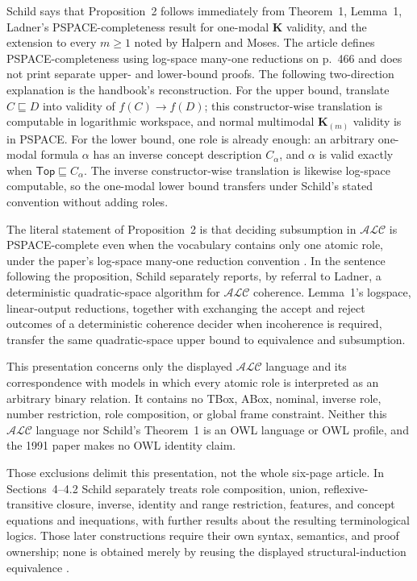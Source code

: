 Schild says that Proposition~2 follows immediately from Theorem~1, Lemma~1,
Ladner's PSPACE-completeness result for one-modal \(\mathbf K\) validity, and
the extension to every \(m\geq 1\) noted by Halpern and Moses.  The article
defines PSPACE-completeness using log-space many-one reductions on p.~466 and
does not print separate upper- and lower-bound proofs.  The following
two-direction explanation is the handbook's reconstruction.  For the upper
bound, translate \(C\sqsubseteq D\) into validity of
\(f(C)\rightarrow f(D)\); this constructor-wise translation is computable in
logarithmic workspace, and normal multimodal \(\mathbf K_{(m)}\) validity is in
PSPACE.  For the lower bound, one role is already enough: an arbitrary
one-modal formula \(\alpha\) has an inverse concept description \(C_\alpha\),
and \(\alpha\) is valid exactly when
\(\mathsf{Top}\sqsubseteq C_\alpha\).  The inverse constructor-wise translation
is likewise log-space computable, so the one-modal lower bound transfers under
Schild's stated convention without adding roles.

The literal statement of Proposition~2 is that deciding subsumption in
\(\mathcal{ALC}\) is PSPACE-complete even when the vocabulary contains only
one atomic role, under the paper's log-space many-one reduction convention
\cite[pp.~466, 468]{Schild1991}.  In the sentence following the proposition,
Schild separately reports, by referral to Ladner, a
deterministic quadratic-space algorithm for \(\mathcal{ALC}\) coherence.
Lemma~1's logspace, linear-output reductions, together with exchanging the
accept and reject outcomes of a deterministic coherence decider when
incoherence is required, transfer the same quadratic-space upper bound to
equivalence and subsumption.

This presentation concerns only the displayed \(\mathcal{ALC}\) language and
its correspondence with models in which every atomic role is interpreted as
an arbitrary binary relation.  It contains no TBox, ABox, nominal, inverse
role, number restriction, role composition, or global frame constraint.
Neither this \(\mathcal{ALC}\) language nor Schild's Theorem~1 is an OWL
language or OWL profile, and the 1991 paper makes no OWL identity claim.

Those exclusions delimit this presentation, not the whole six-page article.
In Sections~4--4.2 Schild separately treats role composition, union,
reflexive-transitive closure, inverse, identity and range restriction,
features, and concept equations and inequations, with further results about
the resulting terminological logics.  Those later constructions require their
own syntax, semantics, and proof ownership; none is obtained merely by reusing
the displayed structural-induction equivalence
\cite[\S\S4--4.2, pp.~468--471]{Schild1991}.
